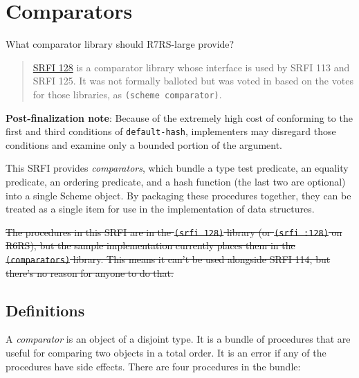 \section{Comparators}
  What comparator library should R7RS-large provide?

\begin{quote}
\href{http://srfi.schemers.org/srfi-128/srfi-128.html}{{​}SRFI 128} is a
comparator library whose interface is used by SRFI 113 and SRFI 125. It
was not formally balloted but was voted in based on the votes for those
libraries, as \texttt{(scheme\ comparator)}.
\end{quote}

\textbf{Post-finalization note}: Because of the extremely high cost of
conforming to the first and third conditions of \texttt{default-hash},
implementers may disregard those conditions and examine only a bounded
portion of the argument.

This SRFI provides \emph{comparators}, which bundle a type test
predicate, an equality predicate, an ordering predicate, and a hash
function (the last two are optional) into a single Scheme object. By
packaging these procedures together, they can be treated as a single
item for use in the implementation of data structures.


\st{The procedures in this SRFI are in the \mbox{\texttt{(srfi\ 128)}}
  library (or \mbox{\texttt{(srfi\ :128)}} on R6RS), but the sample
  implementation currently places them in the
  \mbox{\texttt{(comparators)}} library. This means it can't be used
  alongside SRFI 114, but there's no reason for anyone to do that.}

\subsection{Definitions}

A \emph{comparator} is an object of a disjoint type. It is a bundle of
procedures that are useful for comparing two objects in a total order.
It is an error if any of the procedures have side effects. There are
four procedures in the bundle:

